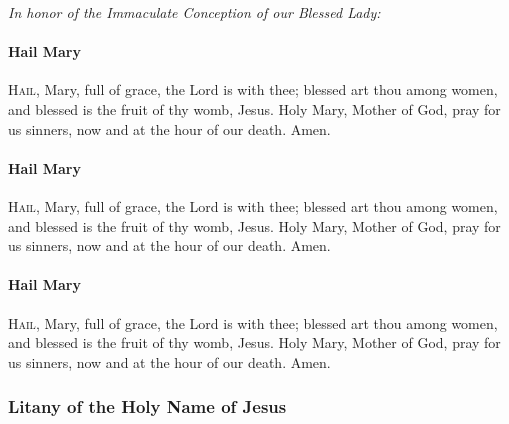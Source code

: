 \documentclass[9pt]{article}
\begin{document}
\begin{multicols}{3}
\textit{In honor of the Immaculate Conception of our Blessed Lady:}

\paragraph{Hail Mary}

\textsc{Hail}, Mary, full of grace, the Lord is with thee;
blessed art thou among women, and blessed is the fruit of
thy womb, Jesus.  Holy Mary, Mother of God, pray for us sinners,
now and at the hour of our death. Amen.

\paragraph{Hail Mary}

\textsc{Hail}, Mary, full of grace, the Lord is with thee;
blessed art thou among women, and blessed is the fruit of
thy womb, Jesus.  Holy Mary, Mother of God, pray for us sinners,
now and at the hour of our death. Amen.

\paragraph{Hail Mary}

\textsc{Hail}, Mary, full of grace, the Lord is with thee;
blessed art thou among women, and blessed is the fruit of
thy womb, Jesus.  Holy Mary, Mother of God, pray for us sinners,
now and at the hour of our death. Amen.

\subsubsection*{Litany of the Holy Name of Jesus}


\end{multicols}
\end{document}
